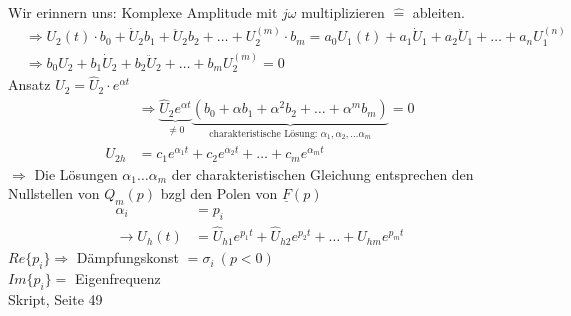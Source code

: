Wir erinnern uns: Komplexe Amplitude mit $j\omega$ multiplizieren
$\widehat{=}$ ableiten.\\
\begin{align}
	&\Rightarrow U_2(t)\cdot b_0 + \dot{U}_2b_1 +
	\ddot{U}_2b_2+\ldots+U_2^{(m)}\cdot
	b_m=a_0U_1(t)+a_1\dot{U}_1+a_2\ddot{U}_1+\ldots+a_nU_1^{(n)}\nonumber\\
	&\Rightarrow b_0U_2+b_1\dot{U}_2+b_2\ddot{U}_2+\ldots+b_mU_2^{(m)}=0\nonumber
\end{align}
Ansatz $U_2=\hat{U}_2\cdot e^{\alpha t}$\\
\begin{align}
	&\Rightarrow \underbrace{\hat{U}_2e^{\alpha t}}_{\neq 0}\underbrace{(b_0+\alpha
b_1+\alpha^2b_2+\ldots+\alpha^mb_m)}_{\text{charakteristische
Lösung: }\alpha_1, \alpha_2, \ldots \alpha_m}=0\nonumber\\
	U_{2h}&=c_1e^{\alpha_1t}+c_2e^{\alpha_2t}+\ldots+c_me^{\alpha_mt}\nonumber
\end{align}
$\Rightarrow$ Die Lösungen $\alpha_1\ldots\alpha_m$ der charakteristischen
Gleichung entsprechen den Nullstellen von $Q_m(p)$ bzgl den Polen von
$\underline{F}(p)$\\
\begin{align}
\alpha_i&=p_i\nonumber\\
\rightarrow
U_h(t)&=\hat{U}_{h1}e^{p_1t}+\hat{U}_{h2}e^{p_2t}+\ldots+U_{hm}e^{p_mt}\nonumber
\end{align}
$Re\{p_i\} \Rightarrow $ Dämpfungskonst $=\sigma_i\ (p<0)$\\
$Im\{p_i\}=$
Eigenfrequenz\\
Skript, Seite 49\\


